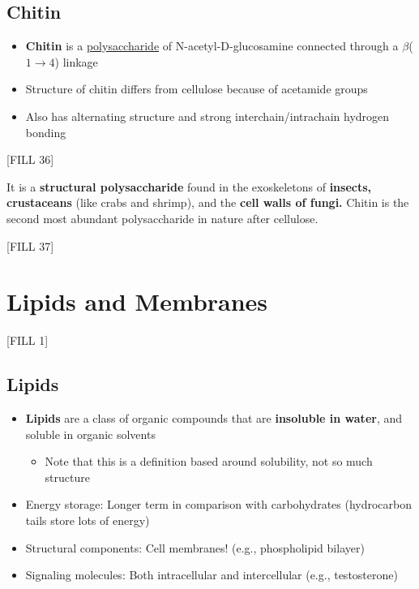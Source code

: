 \documentclass[10pt]{article}
\begin{document}
\subsection*{Chitin}
\begin{itemize}
    \item \textbf{Chitin} is a \underline{polysaccharide} of N-acetyl-D-glucosamine connected through a $\beta$($1 \rightarrow 4$) linkage
    \item Structure of chitin differs from cellulose because of acetamide groups
    \item Also has alternating structure and strong interchain/intrachain hydrogen bonding
\end{itemize}
\begin{center}
    [FILL 36]
\end{center}
It is a \textbf{structural polysaccharide} found in the exoskeletons of \textbf{insects, crustaceans} (like crabs and shrimp), and the \textbf{cell walls of fungi.}  Chitin is the second most abundant polysaccharide in nature after cellulose.
\begin{center}
    [FILL 37]
\end{center}

\section*{Lipids and Membranes}
\begin{center}
    [FILL 1]
\end{center}

\subsection*{Lipids}
\begin{itemize}
    \item \textbf{Lipids} are a class of organic compounds that are \textbf{insoluble in water}, and soluble in organic solvents
    \begin{itemize}
        \item Note that this is a definition based around solubility, not so much structure
    \end{itemize}
    \item Energy storage: Longer term in comparison with carbohydrates  (hydrocarbon tails store lots of energy)
    \item Structural components: Cell membranes!  (e.g., phospholipid bilayer)
    \item Signaling molecules: Both intracellular and intercellular  (e.g., testosterone)
\end{itemize}
\end{document}
